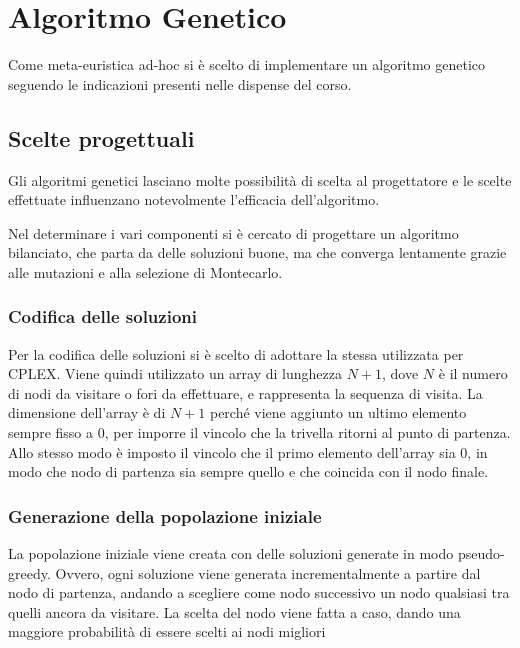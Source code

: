 
\section{Algoritmo Genetico}\label{sec:genetico}

Come meta-euristica ad-hoc si è scelto di implementare un algoritmo genetico seguendo le indicazioni presenti nelle dispense del corso.

\subsection{Scelte progettuali}

Gli algoritmi genetici lasciano molte possibilità di scelta al progettatore e le scelte effettuate influenzano notevolmente l'efficacia dell'algoritmo.

Nel determinare i vari componenti si è cercato di progettare un algoritmo bilanciato, che parta da delle soluzioni buone, ma che converga lentamente grazie alle mutazioni e alla selezione di Montecarlo.

\subsubsection{Codifica delle soluzioni}

Per la codifica delle soluzioni si è scelto di adottare la stessa utilizzata per CPLEX.
Viene quindi utilizzato un array di lunghezza $N+1$, dove $N$ è il numero di nodi da visitare o fori da effettuare, e rappresenta la sequenza di visita. La dimensione dell'array è di $N+1$ perché viene aggiunto un ultimo elemento sempre fisso a $0$, per imporre il vincolo che la trivella ritorni al punto di partenza.
Allo stesso modo è imposto il vincolo che il primo elemento dell'array sia 0, in modo che nodo di partenza sia sempre quello e che coincida con il nodo finale.


\subsubsection{Generazione della popolazione iniziale}

La popolazione iniziale viene creata con delle soluzioni generate in modo pseudo-greedy.
Ovvero, ogni soluzione viene generata incrementalmente a partire dal nodo di partenza, andando a scegliere come nodo successivo un nodo qualsiasi tra quelli ancora da visitare.
La scelta del nodo viene fatta a caso, dando una maggiore probabilità di essere scelti ai nodi migliori

